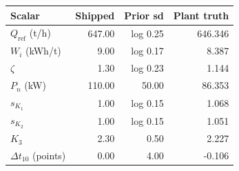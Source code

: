 \begin{tabular}{@{}lrrr@{}}
\toprule
Scalar & Shipped & Prior sd & Plant truth \\
\midrule
$Q_{\mathrm{ref}}$ (t/h) & 647.00 & log 0.25 & 646.346 \\
$W_i$ (kWh/t) & 9.00 & log 0.17 & 8.387 \\
$\zeta$ & 1.30 & log 0.23 & 1.144 \\
$P_n$ (kW) & 110.00 & 50.00 & 86.353 \\
$s_{K_1}$ & 1.00 & log 0.15 & 1.068 \\
$s_{K_2}$ & 1.00 & log 0.15 & 1.051 \\
$K_3$ & 2.30 & 0.50 & 2.227 \\
$\Delta t_{10}$ (points) & 0.00 & 4.00 & -0.106 \\
\bottomrule
\end{tabular}

